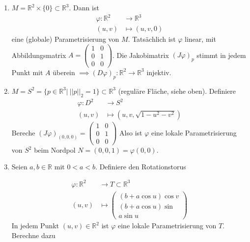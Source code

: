 \documentclass[../main.tex]{subfiles}
\begin{document}
\begin{examples}
\leavevmode
\begin{enumerate}
    \item $M = \mathbb{R}^2 \times \{0\} \subset \mathbb{R}^3$. Dann ist \begin{align*}
        \varphi : \mathbb{R}^2 & \to \mathbb{R}^3 \\
        (u,v) & \mapsto (u,v,0)
    \end{align*}
    eine (globale) Parametrisierung von $M$. Tatsächlich ist $\varphi$ linear, mit Abbildungsmatrix 
    $A =  \left(\begin{smallmatrix} 1 & 0 \\ 0 & 1 \\ 0 & 0
    \end{smallmatrix} \right)$.
    Die Jakobimatrix $(J\varphi )_p$ stimmt in jedem Punkt mit $A$ überein $\implies (D\varphi )_p : \mathbb{R}^2 \to \mathbb{R}^3$ injektiv.
    
    \item
    $M = S^2 = \{ p \in \mathbb{R}^3 \vert \ ||p||_2 = 1 \} \subset \mathbb{R}^3$ (reguläre Fläche, siehe oben).
    Definiere \begin{align*}
        \varphi \colon D^2 & \to S^2 \\
        (u,v) &\mapsto (u,v, \sqrt{1-u^2-v^2})
    \end{align*}
    Bereche $(J \varphi)_{(0,0,0)} = \left(\begin{smallmatrix} 1 & 0 \\ 0 & 1 \\ 0 & 0
    \end{smallmatrix} \right)$ Also ist $\varphi$ eine lokale Parametrisierung von $S^2$ beim Nordpol $N=(0,0,1)=\varphi(0,0)$.
    
    
    \item
    Seien $a,b \in \mathbb{R} $ mit $0 < a < b$. Definiere den Rotationstorus \\
    \begin{minipage}[b]{30em}
        
        \begin{align*}
        \varphi \colon \mathbb{R}^2 & \to T \subset \mathbb{R}^3 \\
        (u,v) & \mapsto \begin{pmatrix}(b+a \cos u)\cos v
        \\(b+a \cos u)\sin
        \\ a \sin u\end{pmatrix}
    \end{align*}
    In jedem Punkt $(u,v) \in \mathbb{R}^2$ ist $\varphi$ eine lokale Parametrisierung von $T$. Berechne dazu
    \end{minipage}
    \begin{minipage}[b]{10em}
    \end{minipage}
    

\end{enumerate}
\end{examples}
\end{document}
